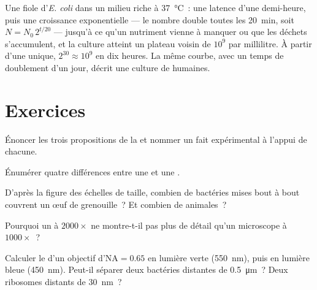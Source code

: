 \begin{example}\label{ex:b1:cell-unit-of-life:growthcurve}
Une fiole d'\emph{E. coli} dans un milieu riche à \qty{37}{\celsius}~:
une latence d'une demi-heure, puis une croissance exponentielle --- le
nombre double toutes les \qty{20}{min}, soit $N = N_0\,2^{t/20}$ ---
jusqu'à ce qu'un nutriment vienne à manquer ou que les déchets
s'accumulent, et la culture atteint un plateau voisin de $10^9$ 
par millilitre. À partir d'une  unique, $2^{30} \approx 10^9$
 en dix heures. La même courbe, avec un temps de doublement d'un
jour, décrit une culture de  humaines.
\end{example}

\section{Exercices}

\begin{exercise}[$\star$]\label{exo:b1:cell-unit-of-life:1}
Énoncer les trois propositions de la  et nommer un
fait expérimental à l'appui de chacune.
\end{exercise}

\begin{exercise}[$\star$]\label{exo:b1:cell-unit-of-life:2}
Énumérer quatre différences entre une  et une .
\end{exercise}

\begin{exercise}[$\star$]\label{exo:b1:cell-unit-of-life:3}
D'après la figure des échelles de taille, combien de bactéries mises
bout à bout couvrent un œuf de grenouille~? Et combien de 
animales~?
\end{exercise}

\begin{exercise}[$\star$]\label{exo:b1:cell-unit-of-life:4}
Pourquoi un  à $2000\times$ ne montre-t-il pas plus
de détail qu'un microscope à $1000\times$~?
\end{exercise}

\begin{exercise}[$\star\star$]\label{exo:b1:cell-unit-of-life:5}
Calculer le  d'un objectif d'$\mathrm{NA} = 0.65$
en lumière verte (\qty{550}{nm}), puis en lumière bleue
(\qty{450}{nm}). Peut-il séparer deux bactéries distantes de
\qty{0.5}{\micro m}~? Deux ribosomes distants de \qty{30}{nm}~?
\end{exercise}

